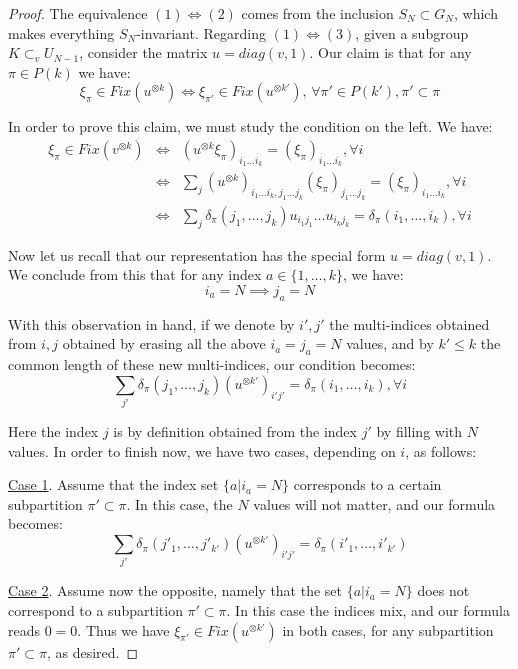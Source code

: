 \documentclass[12pt]{amsbook}
\begin{document}
\begin{proof}
The equivalence $(1)\iff(2)$ comes from the inclusion $S_N\subset G_N$, which makes everything $S_N$-invariant. Regarding $(1)\iff(3)$, given a subgroup $K\subset_vU_{N-1}$, consider the matrix $u=diag(v,1)$. Our claim is that for any $\pi\in P(k)$ we have:
$$\xi_\pi\in Fix(u^{\otimes k})\iff\xi_{\pi'}\in Fix(u^{\otimes k'}),\,\forall\pi'\in P(k'),\pi'\subset\pi$$

In order to prove this claim, we must study the condition on the left. We have:
\begin{eqnarray*}
\xi_\pi\in Fix(v^{\otimes k})
&\iff&(u^{\otimes k}\xi_\pi)_{i_1\ldots i_k}=(\xi_\pi)_{i_1\ldots i_k},\forall i\\
&\iff&\sum_j(u^{\otimes k})_{i_1\ldots i_k,j_1\ldots j_k}(\xi_\pi)_{j_1\ldots j_k}=(\xi_\pi)_{i_1\ldots i_k},\forall i\\
&\iff&\sum_j\delta_\pi(j_1,\ldots,j_k)u_{i_1j_1}\ldots u_{i_kj_k}=\delta_\pi(i_1,\ldots,i_k),\forall i
\end{eqnarray*}

Now let us recall that our representation has the special form $u=diag(v,1)$. We conclude from this that for any index $a\in\{1,\ldots,k\}$, we have:
$$i_a=N\implies j_a=N$$

With this observation in hand, if we denote by $i',j'$ the multi-indices obtained from $i,j$ obtained by erasing all the above $i_a=j_a=N$ values, and by $k'\leq k$ the common length of these new multi-indices, our condition becomes:
$$\sum_{j'}\delta_\pi(j_1,\ldots,j_k)(u^{\otimes k'})_{i'j'}=\delta_\pi(i_1,\ldots,i_k),\forall i$$

Here the index $j$ is by definition obtained from the index $j'$ by filling with $N$ values. In order to finish now, we have two cases, depending on $i$, as follows:

\medskip

\underline{Case 1}. Assume that the index set $\{a|i_a=N\}$ corresponds to a certain subpartition $\pi'\subset\pi$. In this case, the $N$ values will not matter, and our formula becomes:
$$\sum_{j'}\delta_\pi(j'_1,\ldots,j'_{k'})(u^{\otimes k'})_{i'j'}=\delta_\pi(i'_1,\ldots,i'_{k'})$$

\underline{Case 2}. Assume now the opposite, namely that the set $\{a|i_a=N\}$ does not correspond to a subpartition $\pi'\subset\pi$. In this case the indices mix, and our formula reads $0=0$. Thus we have $\xi_{\pi'}\in Fix(u^{\otimes k'})$ in both cases, for any subpartition $\pi'\subset\pi$, as desired.
\end{proof}
\end{document}

